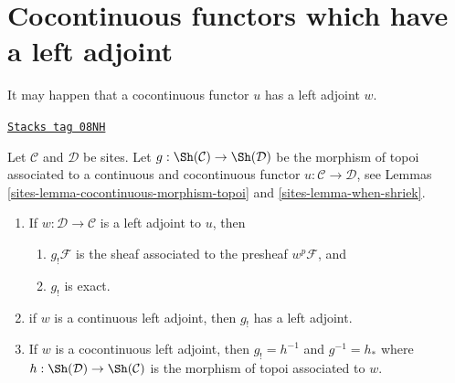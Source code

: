 \section{Cocontinuous functors which have a left adjoint}
\label{sites-section-cocontinuous-left-adjoint}
It may happen that a cocontinuous functor $u$ has a left adjoint $w$.

\begin{lemma}
\label{sites-lemma-have-left-adjoint}
\href{https://stacks.math.columbia.edu/tag/08NH}{\texttt{Stacks tag 08NH}}

Let $\mathcal{C}$ and $\mathcal{D}$ be sites. Let
$g : \Sh(\mathcal{C}) \to \Sh(\mathcal{D})$ be
the morphism of topoi associated to a continuous and cocontinuous functor
$u : \mathcal{C} \to \mathcal{D}$, see
Lemmas \ref{sites-lemma-cocontinuous-morphism-topoi} and
\ref{sites-lemma-when-shriek}.
\begin{enumerate}
\item If $w : \mathcal{D} \to \mathcal{C}$ is a left adjoint to $u$, then
\begin{enumerate}
\item $g_!\mathcal{F}$ is the sheaf associated to the presheaf
$w^p\mathcal{F}$, and
\item $g_!$ is exact.
\end{enumerate}
\item if $w$ is a continuous left adjoint, then $g_!$
has a left adjoint.
\item If $w$ is a cocontinuous left adjoint, then $g_! = h^{-1}$ and
$g^{-1} = h_*$ where $h : \Sh(\mathcal{D}) \to \Sh(\mathcal{C})$ is
the morphism of topoi associated to $w$.
\end{enumerate}
\end{lemma}

